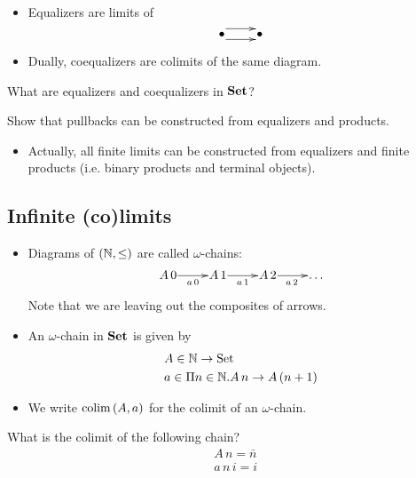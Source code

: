 \documentclass[handout]{beamer}
\begin{document}
\begin{frame}
  \begin{itemize}
  \item Equalizers are limits of
    \[ \xymatrix@1{ \bullet \ar@<1ex>[r] \ar@<-1ex>[r] & \bullet}\]

  \item Dually, coequalizers are colimits of the same diagram.
  \end{itemize}

  \begin{exercise}
    What are equalizers and coequalizers in $\mathbf{Set}$?
  \end{exercise}

  \begin{exercise}
    Show that pullbacks can be constructed from equalizers and products.
  \end{exercise}
  \begin{itemize}
  \item Actually, all finite limits can be constructed from equalizers and
    finite products (i.e. binary products and terminal objects).
  \end{itemize}

\end{frame}

\subsection{Infinite (co)limits}

\begin{frame}
  \begin{itemize}
  \item Diagrams of $(\mathbb{N},\leq)$ are called $\omega$-chains:
    \[ \xymatrix@1{ A\,0 \ar[r]_{a\,0} & A\,1 \ar[r]_{a\,1} & A\,2 \ar[r]_{a\,2} & \dots} \]
    Note that we are leaving out the composites of arrows.

  \item An $\omega$-chain in $\mathbf{Set}$ is given by
    \begin{align*}
      & A \in \mathbb{N} \to \mathrm{Set} \\
      & a \in \Pi n\in\mathbb{N}.A\,n \to A\,(n+1)
    \end{align*}

  \item We write $\mathrm{colim}\,(A,a)$ for the colimit of an $\omega$-chain.

  \end{itemize}
  \begin{exercise}
    What is the colimit of the following chain?
    \begin{align*}
      & A\, n = \bar{n} \\
      & a\,n\,i = i
    \end{align*}
  \end{exercise}

\end{frame}
\end{document}
